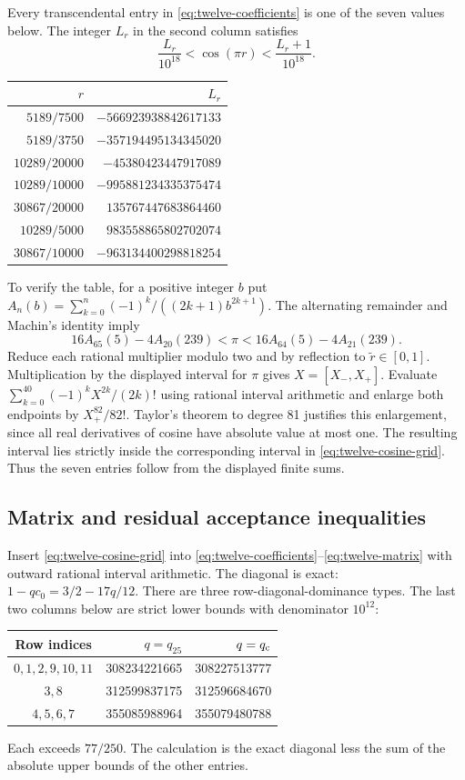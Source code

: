 \documentclass[11pt,reqno]{amsart}
\numberwithin{equation}{section}
\begin{document}
Every transcendental entry in \eqref{eq:twelve-coefficients}
is one of the seven values below.
The integer $L_r$ in the second column satisfies
\begin{equation}
 \frac{L_r}{10^{18}}<\cos(\pi r)<
 \frac{L_r+1}{10^{18}}.
 \label{eq:twelve-cosine-grid}
\end{equation}
\begin{center}
\small
\begin{tabular}{rr}
\toprule
$r$&$L_r$\\
\midrule
$5189/7500$&$-566923938842617133$\\
$5189/3750$&$-357194495134345020$\\
$10289/20000$&$-45380423447917089$\\
$10289/10000$&$-995881234335375474$\\
$30867/20000$&$135767447683864460$\\
$10289/5000$&$983558865802702074$\\
$30867/10000$&$-963134400298818254$\\
\bottomrule
\end{tabular}
\end{center}
To verify the table, for a positive integer $b$ put
$A_n(b)=\sum_{k=0}^n(-1)^k/((2k+1)b^{2k+1})$.
The alternating remainder and Machin's identity imply
\[
 16A_{65}(5)-4A_{20}(239)
 <\pi<
 16A_{64}(5)-4A_{21}(239).
\]
Reduce each rational multiplier modulo two and by reflection
to $\widetilde r\in[0,1]$.
Multiplication by the displayed interval for $\pi$ gives
$X=[X_-,X_+]$.
Evaluate $\sum_{k=0}^{40}(-1)^kX^{2k}/(2k)!$ using rational
interval arithmetic and enlarge both endpoints by $X_+^{82}/82!$.
Taylor's theorem to degree 81 justifies this enlargement,
since all real derivatives of cosine have absolute value at most one.
The resulting interval lies strictly inside the corresponding
interval in \eqref{eq:twelve-cosine-grid}.
Thus the seven entries follow from the displayed finite sums.

\subsection{Matrix and residual acceptance inequalities}

Insert \eqref{eq:twelve-cosine-grid} into
\eqref{eq:twelve-coefficients}--\eqref{eq:twelve-matrix} with
outward rational interval arithmetic.
The diagonal is exact: $1-qc_0=3/2-17q/12$.
There are three row-diagonal-dominance types.
The last two columns below are strict lower bounds with
denominator $10^{12}$:
\begin{center}
\small
\begin{tabular}{crr}
\toprule
Row indices&$q=q_{25}$&$q=q_{\rm c}$\\
\midrule
$0,1,2,9,10,11$&308234221665&308227513777\\
$3,8$&312599837175&312596684670\\
$4,5,6,7$&355085988964&355079480788\\
\bottomrule
\end{tabular}
\end{center}
Each exceeds $77/250$. The calculation is the exact diagonal
less the sum of the absolute upper bounds of the other entries.
\end{document}
